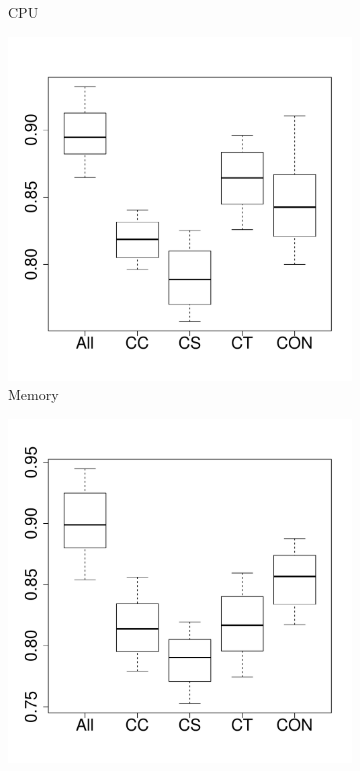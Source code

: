 \documentclass[10pt,journal,compsoc]{IEEEtran}
\begin{document}
\begin{figure}[t]
\begin{subfigure}{0.19\textwidth}
                \caption{CPU}
        \end{subfigure}%
        \begin{subfigure}{0.19\textwidth}
                \includegraphics[width=\linewidth]{Figures/mem-hadoopkeep-importance.pdf}
                \caption{Memory}
        \end{subfigure}%
        \begin{subfigure}{0.19\textwidth}
                \includegraphics[width=\linewidth]{Figures/ioread-hadoopkeep-importance.pdf}

\end{subfigure}
\end{figure}
\end{document}
